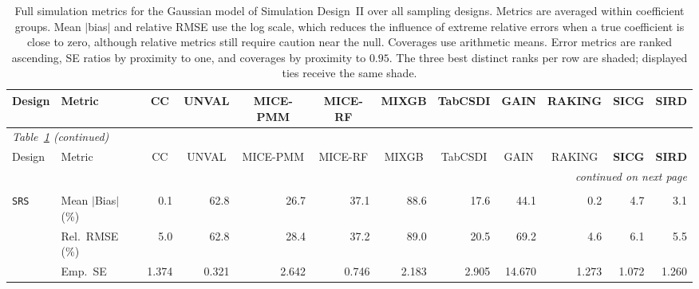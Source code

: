 \begin{landscape}
\footnotesize\setlength{\tabcolsep}{3.5pt}
\begin{longtable}{llrrrrrrrrrr}
\caption{Full simulation metrics for the Gaussian model of Simulation Design~II over all sampling designs. Metrics are averaged within coefficient groups. Mean $|$bias$|$ and relative RMSE use the log scale, which reduces the influence of extreme relative errors when a true coefficient is close to zero, although relative metrics still require caution near the null. Coverages use arithmetic means. Error metrics are ranked ascending, SE ratios by proximity to one, and coverages by proximity to $0.95$. The three best distinct ranks per row are shaded; displayed ties receive the same shade.}
\label{tab:appc_nutri_Gaussian} \\
\toprule
Design & Metric & \multicolumn{1}{c}{CC} & \multicolumn{1}{c}{UNVAL} & \multicolumn{1}{c}{MICE-PMM} & \multicolumn{1}{c}{MICE-RF} & \multicolumn{1}{c}{MIXGB} & \multicolumn{1}{c}{TabCSDI} & \multicolumn{1}{c}{GAIN} & \multicolumn{1}{c}{RAKING} & \multicolumn{1}{c}{\textbf{SICG}} & \multicolumn{1}{c}{\textbf{SIRD}} \\
\midrule
\endfirsthead
\multicolumn{12}{l}{\footnotesize\itshape Table~\ref{tab:appc_nutri_Gaussian} (continued)} \\
\toprule
Design & Metric & \multicolumn{1}{c}{CC} & \multicolumn{1}{c}{UNVAL} & \multicolumn{1}{c}{MICE-PMM} & \multicolumn{1}{c}{MICE-RF} & \multicolumn{1}{c}{MIXGB} & \multicolumn{1}{c}{TabCSDI} & \multicolumn{1}{c}{GAIN} & \multicolumn{1}{c}{RAKING} & \multicolumn{1}{c}{\textbf{SICG}} & \multicolumn{1}{c}{\textbf{SIRD}} \\
\midrule
\endhead
\midrule \multicolumn{12}{r}{\footnotesize\itshape continued on next page} \\
\endfoot
\bottomrule
\endlastfoot
\multicolumn{12}{l}{\textbf{Continuous Phase-Two Covariates}} \\
\addlinespace[2pt]
\quad \texttt{SRS} & Mean $|$Bias$|$ (\%) & \cellcolor{rankone}0.1 & 62.8 & 26.7 & 37.1 & 88.6 & 17.6 & 44.1 & \cellcolor{ranktwo}0.2 & 4.7 & \cellcolor{rankthree}3.1 \\
 & Rel.\ RMSE (\%) & \cellcolor{ranktwo}5.0 & 62.8 & 28.4 & 37.2 & 89.0 & 20.5 & 69.2 & \cellcolor{rankone}4.6 & 6.1 & \cellcolor{rankthree}5.5 \\
 & Emp.\ SE & 1.374 & 0.321 & 2.642 & 0.746 & 2.183 & 2.905 & 14.670 & 1.273 & 1.072 & 1.260 \\

\end{longtable}
\end{landscape}
